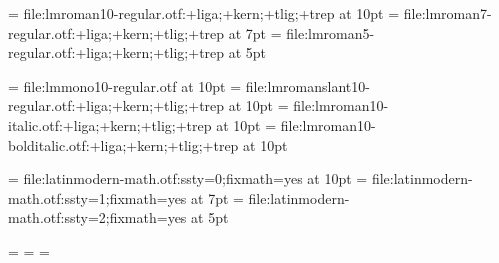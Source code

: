 




\font\tenrm   = file:lmroman10-regular.otf:+liga;+kern;+tlig;+trep at 10pt
\font\sevenrm = file:lmroman7-regular.otf:+liga;+kern;+tlig;+trep  at  7pt
\font\fiverm  = file:lmroman5-regular.otf:+liga;+kern;+tlig;+trep  at  5pt

\font\tentt   = file:lmmono10-regular.otf at 10pt
\font\tensl   = file:lmromanslant10-regular.otf:+liga;+kern;+tlig;+trep at 10pt
\font\tenit   = file:lmroman10-italic.otf:+liga;+kern;+tlig;+trep at 10pt
\font\tenbi   = file:lmroman10-bolditalic.otf:+liga;+kern;+tlig;+trep at 10pt

\let \teni    = \relax
\let \seveni  = \relax
\let \fivei   = \relax
\let \tensy   = \relax
\let \sevensy = \relax
\let \fivesy  = \relax
\let \tenex   = \relax
\let \tenbf   = \relax
\let \sevenbf = \relax
\let \fivebf  = \relax

\tenrm

\font\mathfonttextupright         = file:latinmodern-math.otf:ssty=0;fixmath=yes at 10pt
\font\mathfontscriptupright       = file:latinmodern-math.otf:ssty=1;fixmath=yes at  7pt
\font\mathfontscriptscriptupright = file:latinmodern-math.otf:ssty=2;fixmath=yes at  5pt

 = \mathfonttextupright
{} = \mathfontscriptupright
{} = \mathfontscriptscriptupright

\newtoks\everymathrm
\newtoks\everymathmit
\newtoks\everymathcal
\newtoks\everymathit
\newtoks\everymathsl
\newtoks\everymathbf
\newtoks\everymathbi
\newtoks\everymathtt

